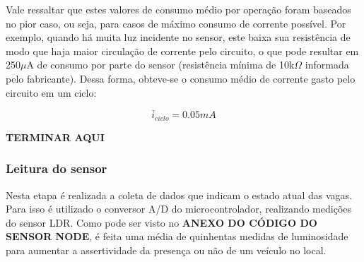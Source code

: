 \documentclass[oneside,openright,12pt]{ufsm_2015} %
\begin{document}
    Vale ressaltar que estes valores de consumo médio por operação foram baseados no pior caso, ou seja, para casos de máximo consumo de corrente possível. Por exemplo, quando há muita luz incidente no sensor, este baixa sua resistência de modo que haja maior circulação de corrente pelo circuito, o que pode resultar em 250$\mu$A de consumo por parte do sensor (resistência mínima  de 10k$\Omega$ informada pelo fabricante). Dessa forma, obteve-se o consumo médio de corrente gasto pelo circuito em um ciclo:
    
    \begin{equation*}
        \overline{i}_{ciclo} = 0.05mA
    \end{equation*}
    
    
    
    
    
    
    
    
    \textbf{TERMINAR AQUI}
    
    \subsubsection{Leitura do sensor}
    Nesta etapa é realizada a coleta de dados que indicam o estado atual das vagas. Para isso é utilizado o conversor A/D do microcontrolador, realizando medições do sensor LDR. Como pode ser visto no \textbf{ANEXO DO CÓDIGO DO SENSOR NODE}, é feita uma média de quinhentas medidas de luminosidade para aumentar a assertividade da presença ou não de um veículo no local.
    
\end{document}
